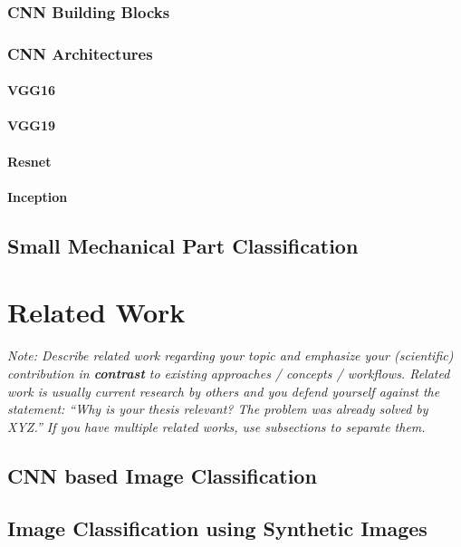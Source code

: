 \documentclass[a4paper,12pt,twoside]{report}
\begin{document}
\subsection{CNN Building Blocks}
\subsection{CNN Architectures}
\subsubsection{VGG16}
\subsubsection{VGG19}
\subsubsection{Resnet}
\subsubsection{Inception}

\section{Small Mechanical Part Classification}











\chapter{Related Work}

\textit{Note: Describe related work regarding your topic and emphasize your (scientific) contribution in \textbf{contrast} to existing approaches / concepts / workflows. Related work is usually current research by others and you defend yourself against the statement: ``Why is your thesis relevant? The problem was already solved by XYZ.'' If you have multiple related works, use subsections to separate them.}

\section{CNN based Image Classification}
\section{Image Classification using Synthetic Images}
\end{document}
